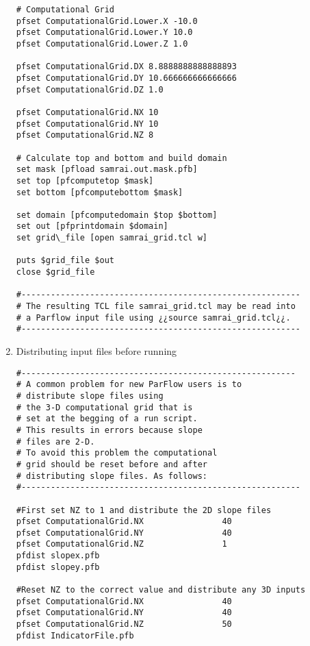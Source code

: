 \begin{enumerate}
\begin{display}
\begin{verbatim}
# Computational Grid
pfset ComputationalGrid.Lower.X -10.0
pfset ComputationalGrid.Lower.Y 10.0
pfset ComputationalGrid.Lower.Z 1.0

pfset ComputationalGrid.DX 8.8888888888888893
pfset ComputationalGrid.DY 10.666666666666666
pfset ComputationalGrid.DZ 1.0

pfset ComputationalGrid.NX 10
pfset ComputationalGrid.NY 10
pfset ComputationalGrid.NZ 8

# Calculate top and bottom and build domain
set mask [pfload samrai.out.mask.pfb]
set top [pfcomputetop $mask]
set bottom [pfcomputebottom $mask]

set domain [pfcomputedomain $top $bottom]
set out [pfprintdomain $domain]
set grid\_file [open samrai_grid.tcl w]

puts $grid_file $out
close $grid_file

#---------------------------------------------------------
# The resulting TCL file samrai_grid.tcl may be read into
# a Parflow input file using ¿¿source samrai_grid.tcl¿¿.
#---------------------------------------------------------

\end{verbatim}\end{display}
\item Distributing input files before running
\label{dist example}
\begin{display}\begin{verbatim}
#--------------------------------------------------------
# A common problem for new ParFlow users is to
# distribute slope files using
# the 3-D computational grid that is
# set at the begging of a run script.
# This results in errors because slope
# files are 2-D.
# To avoid this problem the computational
# grid should be reset before and after
# distributing slope files. As follows:
#---------------------------------------------------------

#First set NZ to 1 and distribute the 2D slope files
pfset ComputationalGrid.NX                40
pfset ComputationalGrid.NY                40
pfset ComputationalGrid.NZ                1
pfdist slopex.pfb
pfdist slopey.pfb

#Reset NZ to the correct value and distribute any 3D inputs
pfset ComputationalGrid.NX                40
pfset ComputationalGrid.NY                40
pfset ComputationalGrid.NZ                50
pfdist IndicatorFile.pfb

\end{verbatim}\end{display}


\end{enumerate}
